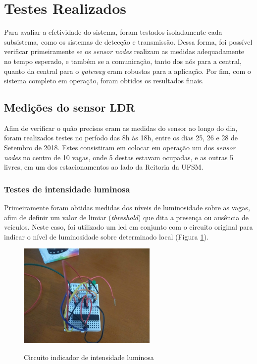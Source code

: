 \documentclass[oneside,openright,12pt]{ufsm_2015} %
\begin{document}
    \section{Testes Realizados}
    Para avaliar a efetividade do sistema, foram testados isoladamente cada subsistema, como os sistemas de detecção e transmissão. Dessa forma, foi possível verificar primeiramente se os \textit{sensor nodes} realizam as medidas adequadamente no tempo esperado, e também se a comunicação, tanto dos nós para a central, quanto da central para o \textit{gateway} eram robustas para a aplicação. Por fim, com o sistema completo em operação, foram obtidos os resultados finais.

    \subsection{Medições do sensor LDR}
    Afim de verificar o quão precisas eram as medidas do sensor ao longo do dia, foram realizados testes no período das 8h às 18h, entre os dias 25, 26 e 28 de Setembro de 2018. Estes consistiram em colocar em operação um dos \textit{sensor nodes} no centro de 10 vagas, onde 5 destas estavam ocupadas, e as outras 5 livres, em um dos estacionamentos ao lado da Reitoria da UFSM. 
    
    \subsubsection{Testes de intensidade luminosa}
    Primeiramente foram obtidas medidas dos níveis de luminosidade sobre as vagas, afim de definir um valor de limiar (\textit{threshold}) que dita a presença ou ausência de veículos. Neste caso, foi utilizado um led em conjunto com o circuito original para indicar o nível de luminosidade sobre determinado local (Figura \ref{fig:led-indicator}).
    
    \begin{figure}[H]
     	    \caption{\label{exepretex} Circuito indicador de intensidade luminosa}
            \centering
            \includegraphics[width=0.6\textwidth]{figuras/indicador.jpg}
            \vspace{\baselineskip} %
            \label{fig:led-indicator}
    \end{figure}
    
\end{document}
